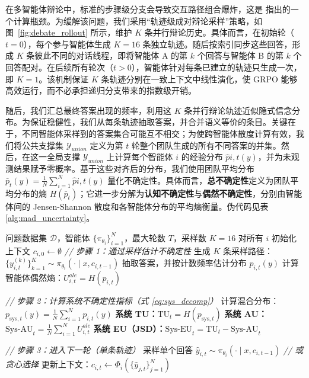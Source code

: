 \documentclass{article}
\theoremstyle{plain}
\theoremstyle{definition}
\theoremstyle{remark}
\begin{document}
在多智能体辩论中，标准的步骤级分支会导致交互路径组合爆炸，这是 \citet{feng2025gigpo} 指出的一个计算瓶颈。为缓解该问题，我们采用“轨迹级成对辩论采样”策略，如图~\ref{fig:debate_rollout} 所示，维护 $K$ 条并行辩论历史。具体而言，在初始轮（$t=0$），每个参与智能体生成 $K=16$ 条独立轨迹。随后按索引同步这些回答，形成 $K$ 条彼此不同的对话线程，即将智能体 A 的第 $k$ 个回答与智能体 B 的第 $k$ 个回答配对。在后续所有轮次（$t>0$），智能体针对每条已建立的轨迹只生成一次，即 $K=1$。该机制保证 $K$ 条轨迹分别在一致上下文中线性演化，使 GRPO 能够高效运行，而不必承担递归分支带来的指数级开销。


随后，我们汇总最终答案出现的频率，利用这 $K$ 条并行辩论轨迹近似隐式信念分布。为保证稳健性，我们从每条轨迹抽取答案，并合并语义等价的条目。关键在于，不同智能体采样到的答案集合可能互不相交；为使跨智能体散度计算有效，我们将公共支撑集 $\mathcal{Y}_{union}$ 定义为第 $t$ 轮整个团队生成的所有不同答案的并集。然后，在这一全局支撑 $\mathcal{Y}_{union}$ 上计算每个智能体 $i$ 的经验分布 $\hat{p}{i,t}(y)$，并为未观测结果赋予零概率。基于这些对齐后的分布，我们使用团队平均分布 $\bar{p}_t(y) = \frac{1}{N}\sum_{i=1}^N \hat{p}{i,t}(y)$ 量化不确定性。具体而言，\textbf{总不确定性}定义为团队平均分布的熵 $H(\bar{p}_t)$；它进一步分解为\textbf{认知不确定性}与\textbf{偶然不确定性}，分别由智能体间的 Jensen-Shannon 散度和各智能体分布的平均熵衡量。伪代码见表 \ref{alg:mad_uncertainty}。



\begin{algorithm}[p]
   \caption{MAD 不确定性量化}
   \label{alg:mad_uncertainty}
\begin{algorithmic}[1]
   问题数据集 $\mathcal{D}$，智能体 $\{\pi_{\theta_i}\}_{i=1}^N$，最大轮数 $T$，采样数 $K=16$
   \STATE 对所有 $i$ 初始化上下文 $c_{i, 0} \leftarrow \emptyset$
       \STATE \emph{// 步骤 1：通过采样估计不确定性}
           \STATE 生成 $K$ 条采样路径：$\{y_{i,t}^{(k)}\}_{k=1}^K \sim \pi_{\theta_i}(\cdot \mid x, c_{i, t-1})$
           \STATE 抽取答案，并按计数频率估计分布 $p_{i,t}(y)$
           \STATE 计算智能体偶然熵：$U_{i,t}^{ale} = H(p_{i,t})$
       \ENDFOR
       
       \STATE \emph{// 步骤 2：计算系统不确定性指标（式 \ref{eq:sys_decomp}）}
       \STATE 计算混合分布：$p_{\mathrm{sys},t}(y) = \frac{1}{N} \sum_{i=1}^N p_{i,t}(y)$
       \STATE \textbf{系统 TU：}$\mathrm{TU}_t = H(p_{\mathrm{sys},t})$
       \STATE \textbf{系统 AU：}$\mathrm{Sys\mbox{-}AU}_t = \frac{1}{N} \sum_{i=1}^N U_{i,t}^{ale}$
       \STATE \textbf{系统 EU（JSD）：}$\mathrm{Sys\mbox{-}EU}_t = \mathrm{TU}_t - \mathrm{Sys\mbox{-}AU}_t$
       
       \STATE \emph{// 步骤 3：进入下一轮（单条轨迹）}
           \STATE 采样单个回答 $\hat{y}_{i,t} \sim \pi_{\theta_i}(\cdot \mid x, c_{i, t-1})$ \emph{// 或贪心选择}
       \ENDFOR
       \STATE 更新上下文：$c_{i, t} \leftarrow \Phi_i(\{\hat{y}_{j,t}\}_{j=1}^N)$
   \ENDFOR
   \ENDFOR
\end{algorithmic}
\end{algorithm}
\end{document}
